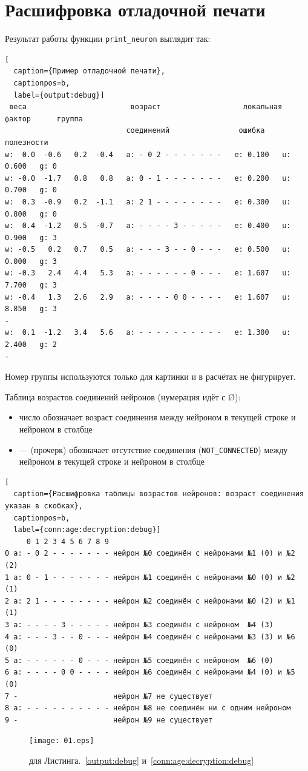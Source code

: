 \documentclass[unicode, 12pt, a4paper,oneside,fleqn]{article}
\begin{document}
\clearpage
\section{Расшифровка отладочной печати}
Результат работы функции \verb'print_neuron' выглядит так:

\begin{lstlisting}[
  caption={Пример отладочной печати},
  captionpos=b,
  label={output:debug}]
 веса                        возраст                   локальная   фактор      группа
                            соединений                ошибка      полезности
w:  0.0  -0.6   0.2  -0.4   a: - 0 2 - - - - - - -   e: 0.100   u: 0.600   g: 0
w: -0.0  -1.7   0.8   0.8   a: 0 - 1 - - - - - - -   e: 0.200   u: 0.700   g: 0
w:  0.3  -0.9   0.2  -1.1   a: 2 1 - - - - - - - -   e: 0.300   u: 0.800   g: 0
w:  0.4  -1.2   0.5  -0.7   a: - - - - 3 - - - - -   e: 0.400   u: 0.900   g: 3
w: -0.5   0.2   0.7   0.5   a: - - - 3 - - 0 - - -   e: 0.500   u: 0.000   g: 3
w: -0.3   2.4   4.4   5.3   a: - - - - - - 0 - - -   e: 1.607   u: 7.700   g: 3
w: -0.4   1.3   2.6   2.9   a: - - - - 0 0 - - - -   e: 1.607   u: 8.850   g: 3
-
w:  0.1  -1.2   3.4   5.6   a: - - - - - - - - - -   e: 1.300   u: 2.400   g: 2
-
\end{lstlisting}

Номер группы используются только для картинки и в расчётах не фигурирует.


Таблица возрастов соединений нейронов (нумерация идёт с \O):
\begin{itemize}
\item число обозначает возраст соединения между нейроном в текущей
  строке и нейроном в столбце
\item --- (прочерк) обозначает отсутствие соединения
  (\verb'NOT_CONNECTED') между нейроном в текущей строке и нейроном в
  столбце
\end{itemize}
\begin{lstlisting}[
  caption={Расшифровка таблицы возрастов нейронов: возраст соединения указан в скобках},
  captionpos=b,
  label={conn:age:decryption:debug}]
     0 1 2 3 4 5 6 7 8 9
0 a: - 0 2 - - - - - - - нейрон №0 соединён с нейронами №1 (0) и №2 (2)
1 a: 0 - 1 - - - - - - - нейрон №1 соединён с нейронами №0 (0) и №2 (1)
2 a: 2 1 - - - - - - - - нейрон №2 соединён с нейронами №0 (2) и №1 (1)
3 a: - - - - 3 - - - - - нейрон №3 соединён с нейроном  №4 (3)
4 a: - - - 3 - - 0 - - - нейрон №4 соединён с нейронами №3 (3) и №6 (0)
5 a: - - - - - - 0 - - - нейрон №5 соединён с нейроном  №6 (0)
6 a: - - - - 0 0 - - - - нейрон №6 соединён с нейронами №4 (0) и №5 (0)
7 -                      нейрон №7 не существует
8 a: - - - - - - - - - - нейрон №8 не соединён ни с одним нейроном
9 -                      нейрон №9 не существует
\end{lstlisting}

\begin{figure}[h]
  \center
  \texttt{[image: 01.eps]} %
  \caption{для Листинга.~\ref{output:debug} и~\ref{conn:age:decryption:debug}}
  \label{graph:img}
\end{figure}
\end{document}
